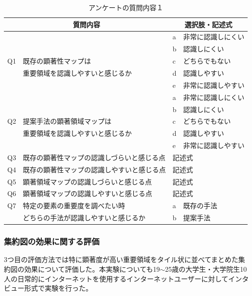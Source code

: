 \begin{table}[h]
  \caption{アンケートの質問内容１}
  \label{table:question01}
  \centering
  \begingroup
  \renewcommand{\arraystretch}{1} %
  \small
  \begin{tabular}{|l|l|l|l|}
    \hline
    \multicolumn{2}{|c|}{質問内容} & \multicolumn{2}{|c|}{選択肢・記述式} \\ \hline
    & & a & 非常に認識しにくい \\ \cline{3-4}
    & & b & 認識しにくい \\ \cline{3-4}
    Q1 & 既存の顕著性マップは & c & どちらでもない \\ \cline{3-4}
    & 重要領域を認識しやすいと感じるか & d & 認識しやすい \\ \cline{3-4}
    & & e & 非常に認識しやすい \\ \hline
    & & a & 非常に認識しにくい \\ \cline{3-4}
    & & b & 認識しにくい \\ \cline{3-4}
    Q2 & 提案手法の顕著領域マップは & c & どちらでもない \\ \cline{3-4}
    & 重要領域を認識しやすいと感じるか & d & 認識しやすい \\ \cline{3-4}
    & & e & 非常に認識しやすい \\ \hline
    Q3 & 既存の顕著性マップの認識しづらいと感じる点 & \multicolumn{2}{|l|}{記述式} \\ \hline
    Q4 & 既存の顕著性マップの認識しやすいと感じる点 & \multicolumn{2}{|l|}{記述式} \\ \hline
    Q5 & 顕著領域マップの認識しづらいと感じる点 & \multicolumn{2}{|l|}{記述式} \\ \hline
    Q6 & 顕著領域マップの認識しやすいと感じる点 & \multicolumn{2}{|l|}{記述式} \\ \hline
    Q7 & 特定の要素の重要度を調べたい時 & a & 既存の手法 \\ \cline{3-4}
    & どちらの手法が認識しやすいと感じるか  & b & 提案手法 \\ \hline
    \end{tabular}
    \endgroup
\end{table}


\subsubsection{集約図の効果に関する評価}
\par 3つ目の評価方法では特に顕著度が高い重要領域をタイル状に並べてまとめた集約図の効果について評価した。本実験についても19$\sim$25歳の大学生・大学院生10人の日常的にインターネットを使用するインターネットユーザーに対してインタビュー形式で実験を行った。


